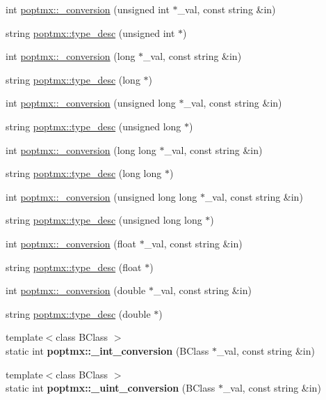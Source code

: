 \begin{DoxyCompactItemize}
int \hyperlink{group__poptmx_gab27d0fa7814cc1c639886222c70a30e3}{poptmx::\_\-conversion} (unsigned int $\ast$\_\-val, const string \&in)
\item 
string \hyperlink{group__poptmx_ga0e18472e802326a0f34af82e315afccb}{poptmx::type\_\-desc} (unsigned int $\ast$)
\item 
int \hyperlink{group__poptmx_ga386f35951096aaa3bde9e6838b6d46a0}{poptmx::\_\-conversion} (long $\ast$\_\-val, const string \&in)
\item 
string \hyperlink{group__poptmx_ga5a1a2623ad5a80147f6b21d24ead6dbb}{poptmx::type\_\-desc} (long $\ast$)
\item 
int \hyperlink{group__poptmx_gadc1a172a2ac03421fed4fc8b9f7f4810}{poptmx::\_\-conversion} (unsigned long $\ast$\_\-val, const string \&in)
\item 
string \hyperlink{group__poptmx_ga461a2322f004fe9b6bdc2edb5ef22f08}{poptmx::type\_\-desc} (unsigned long $\ast$)
\item 
int \hyperlink{group__poptmx_ga2fd44a1412ce0b08b297eea2ceb03bbc}{poptmx::\_\-conversion} (long long $\ast$\_\-val, const string \&in)
\item 
string \hyperlink{group__poptmx_ga30cdfa6060b12c2195be8c793f65f3f2}{poptmx::type\_\-desc} (long long $\ast$)
\item 
int \hyperlink{group__poptmx_gad900536e51905ad1a546e748ab6c9f33}{poptmx::\_\-conversion} (unsigned long long $\ast$\_\-val, const string \&in)
\item 
string \hyperlink{group__poptmx_ga321af5534dc27bf9265108b50a4e3ac0}{poptmx::type\_\-desc} (unsigned long long $\ast$)
\item 
int \hyperlink{group__poptmx_ga675aed0dfee1c89e43cf45fa8b7eb73a}{poptmx::\_\-conversion} (float $\ast$\_\-val, const string \&in)
\item 
string \hyperlink{group__poptmx_gab314ef398a79fa4b18d773aaa52406aa}{poptmx::type\_\-desc} (float $\ast$)
\item 
int \hyperlink{group__poptmx_gae8cce24419fae612f0d15dd994533f6d}{poptmx::\_\-conversion} (double $\ast$\_\-val, const string \&in)
\item 
string \hyperlink{group__poptmx_gad1af42dabb88457eda175999f6485306}{poptmx::type\_\-desc} (double $\ast$)
\item 
\hypertarget{group__poptmx_ga8af83958edec83e1f5d9350fabf94e63}{
{\footnotesize template$<$class BClass $>$ }\\static int {\bfseries poptmx::\_\-int\_\-conversion} (BClass $\ast$\_\-val, const string \&in)}
\label{group__poptmx_ga8af83958edec83e1f5d9350fabf94e63}

\item 
\hypertarget{group__poptmx_ga86e4e17656e73720a22fdf2c906564cf}{
{\footnotesize template$<$class BClass $>$ }\\static int {\bfseries poptmx::\_\-uint\_\-conversion} (BClass $\ast$\_\-val, const string \&in)}
\label{group__poptmx_ga86e4e17656e73720a22fdf2c906564cf}

\end{DoxyCompactItemize}


